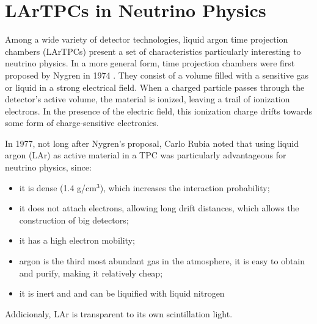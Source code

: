 
\label{Chapter:2}

\section{LArTPCs in Neutrino Physics}
Among a wide variety of detector technologies, liquid argon time projection chambers (LArTPCs) present a set of characteristics particularly interesting to neutrino physics. 
In a more general form, time projection chambers were first proposed by Nygren in 1974 \cite{Nygren}. They consist of a volume filled with a sensitive gas or liquid in a strong electrical field. When a charged particle passes through the detector's active volume, the material is ionized, leaving a trail of ionization electrons. In the presence of the electric field, this ionization charge drifts towards some form of charge-sensitive electronics.

In 1977, not long after Nygren's proposal, Carlo Rubia noted that using liquid argon (LAr) as active material in a TPC was particularly advantageous for neutrino physics, since:
\begin{itemize}
	\item it is dense (1.4 g/cm$^3$), which increases the interaction probability;
 	\item it does not attach electrons, allowing long drift distances, which allows the construction of big detectors;
  	\item it has a high electron mobility;
   	\item argon is the third most abundant gas in the atmosphere, it is easy to obtain and purify, making it relatively cheap;
  	\item it is inert and and can be liquified with liquid nitrogen \cite{Rubia_ANewConcept}
\end{itemize}
Addicionaly, LAr is transparent to its own scintillation light. 

